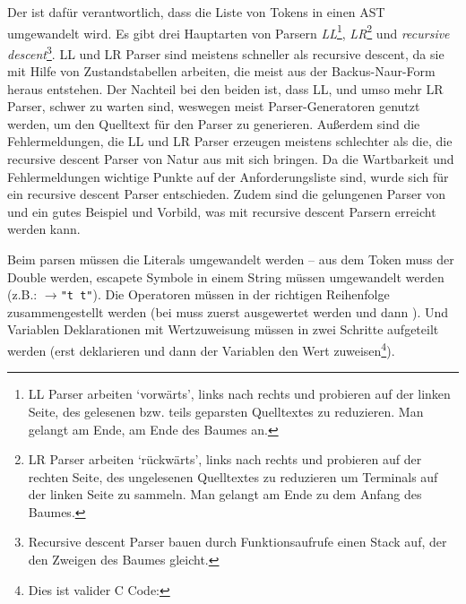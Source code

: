       Der  ist dafür verantwortlich, dass die Liste von Tokens in einen AST umgewandelt wird. Es gibt drei Hauptarten von Parsern\autocite[S.77\,f.]{eirund2013formale} \emph{LL}\footnote{
        LL Parser arbeiten `vorwärts', links nach rechts und probieren auf der linken Seite, des gelesenen bzw. teils geparsten Quelltextes zu reduzieren. Man gelangt am Ende, am Ende des Baumes an.
      }, \emph{LR}\footnote{
        LR Parser arbeiten `rückwärts', links nach rechts und probieren auf der rechten Seite, des ungelesenen Quelltextes zu reduzieren um Terminals auf der linken Seite zu sammeln. Man gelangt am Ende zu dem Anfang des Baumes.\autocite{cs143-stanford}
      } und \emph{recursive descent}\footnote{
        Recursive descent Parser bauen durch Funktionsaufrufe einen Stack auf, der den Zweigen des Baumes gleicht.
      }.
      LL und LR Parser sind meistens schneller als recursive descent, da sie mit Hilfe von Zustandstabellen arbeiten, die meist aus der Backus-Naur-Form heraus entstehen. Der Nachteil bei den beiden ist, dass LL, und umso mehr LR Parser, schwer zu warten sind, weswegen meist Parser-Generatoren genutzt werden, um den Quelltext für den Parser zu generieren. Außerdem sind die Fehlermeldungen, die LL und LR Parser erzeugen meistens schlechter als die, die recursive descent Parser von Natur aus mit sich bringen\autocite{scott2010gll}. Da die Wartbarkeit und Fehlermeldungen wichtige Punkte auf der Anforderungsliste sind, wurde sich für ein recursive descent Parser entschieden. Zudem sind die gelungenen Parser von  und  ein gutes Beispiel und Vorbild, was mit recursive descent Parsern erreicht werden kann.

      Beim parsen müssen die Literals umgewandelt werden -- aus dem Token  muss der Double  werden, escapete Symbole in einem String müssen umgewandelt werden (z.B.: $\rightarrow$\texttt{"t  t"}). Die Operatoren müssen in der richtigen Reihenfolge zusammengestellt werden (bei  muss  zuerst ausgewertet werden und dann ). Und Variablen Deklarationen mit Wertzuweisung müssen in zwei Schritte aufgeteilt werden (erst deklarieren und dann der Variablen den Wert zuweisen\footnote{
        Dies ist valider C Code: 
      }).

